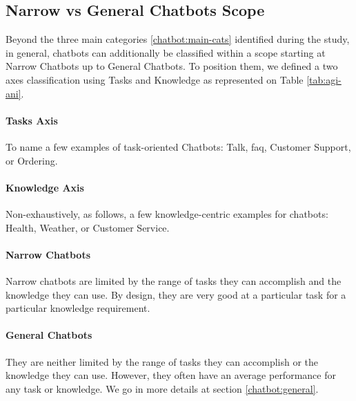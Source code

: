 \subsection{Narrow vs General Chatbots Scope}
Beyond the three main categories \ref{chatbot:main-cats} identified during the study, in general, chatbots can additionally be classified within a scope starting at Narrow Chatbots up to General Chatbots. To position them, we defined a two axes classification using Tasks and Knowledge as represented on Table \ref{tab:agi-ani}.

\paragraph{Tasks Axis}
To name a few examples of task-oriented Chatbots: Talk, \gls{faq}, Customer Support, or Ordering.

\paragraph{Knowledge Axis}
Non-exhaustively, as follows, a few knowledge-centric examples for chatbots: Health, Weather, or Customer Service.

\paragraph{Narrow Chatbots}
Narrow chatbots are limited by the range of tasks they can accomplish and the knowledge they can use. By design, they are very good at a particular task for a particular knowledge requirement.

\paragraph{General Chatbots}
They are neither limited by the range of tasks they can accomplish or the knowledge they can use. However, they often have an average performance for any task or knowledge. We go in more details at section \ref{chatbot:general}.


\newcommand\MyBox[2]{
  \fbox{\lower0.75cm
    \vbox to 2cm{\vfil
      \hbox to 6cm{\hfil\parbox{5cm}{#1\\#2}\hfil}
      \vfil}
  }
}


